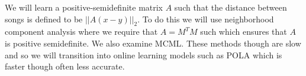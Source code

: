 \documentclass[a4paper,10pt]{article}
\begin{document}
We will learn a positive-semidefinite matrix $A$ such that the distance between songs is defined to be $||A(x-y)||_2$. To do this we will use neighborhood component analysis where we require that $A=M^TM$ such which ensures that $A$ is positive semidefinite. We also examine MCML. These methods though are slow and so we will transition into online learning models such as POLA which is faster though often less accurate.
{}
\end{document}
